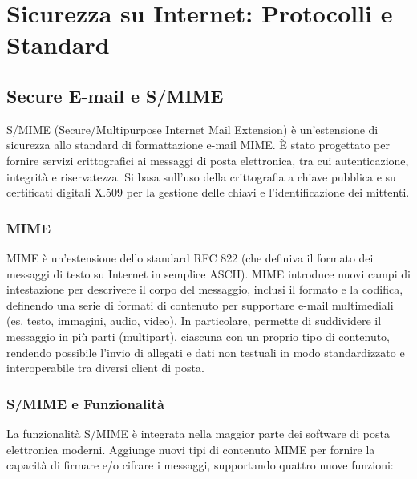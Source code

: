 \chapter{Sicurezza su Internet: Protocolli e Standard}

\section{Secure E-mail e S/MIME}

S/MIME (Secure/Multipurpose Internet Mail Extension) è un'estensione di sicurezza allo standard di formattazione e-mail MIME. È stato progettato per fornire servizi crittografici ai messaggi di posta elettronica, tra cui autenticazione, integrità e riservatezza. Si basa sull’uso della crittografia a chiave pubblica e su certificati digitali X.509 per la gestione delle chiavi e l'identificazione dei mittenti.

\subsection{MIME}
MIME è un'estensione dello standard RFC 822 (che definiva il formato dei messaggi di testo su Internet in semplice ASCII). MIME introduce nuovi campi di intestazione per descrivere il corpo del messaggio, inclusi il formato e la codifica, definendo una serie di formati di contenuto per supportare e-mail multimediali (es. testo, immagini, audio, video). In particolare, permette di suddividere il messaggio in più parti (multipart), ciascuna con un proprio tipo di contenuto, rendendo possibile l'invio di allegati e dati non testuali in modo standardizzato e interoperabile tra diversi client di posta.

\subsection{S/MIME e Funzionalità}
La funzionalità S/MIME è integrata nella maggior parte dei software di posta elettronica moderni. Aggiunge nuovi tipi di contenuto MIME per fornire la capacità di firmare e/o cifrare i messaggi, supportando quattro nuove funzioni:


